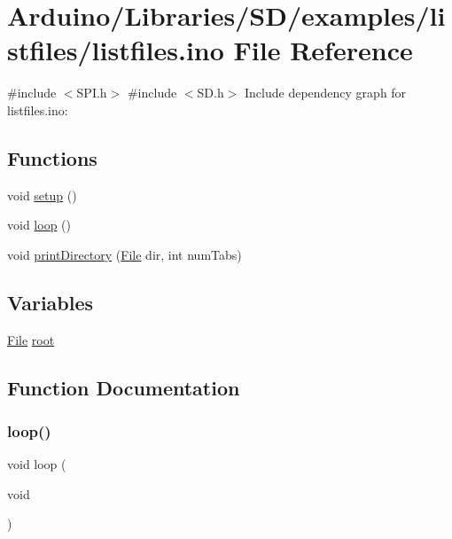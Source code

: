 \hypertarget{listfiles_8ino}{}\section{Arduino/\+Libraries/\+S\+D/examples/listfiles/listfiles.ino File Reference}
\label{listfiles_8ino}
{\ttfamily \#include $<$S\+P\+I.\+h$>$}\newline
{\ttfamily \#include $<$S\+D.\+h$>$}\newline
Include dependency graph for listfiles.\+ino\+:
\subsection*{Functions}
\begin{DoxyCompactItemize}
\item 
void \hyperlink{listfiles_8ino_a4fc01d736fe50cf5b977f755b675f11d}{setup} ()
\item 
void \hyperlink{listfiles_8ino_afe461d27b9c48d5921c00d521181f12f}{loop} ()
\item 
void \hyperlink{listfiles_8ino_a7af041cc472e7136af6f1ede239aabfb}{print\+Directory} (\hyperlink{class_s_d_lib_1_1_file}{File} dir, int num\+Tabs)
\end{DoxyCompactItemize}
\subsection*{Variables}
\begin{DoxyCompactItemize}
\item 
\hyperlink{class_s_d_lib_1_1_file}{File} \hyperlink{listfiles_8ino_a1859aa3abeb9f54662bf4e5963224ee7}{root}
\end{DoxyCompactItemize}


\subsection{Function Documentation}
\mbox{\label{listfiles_8ino_afe461d27b9c48d5921c00d521181f12f}} 
\subsubsection{\texorpdfstring{loop()}{loop()}}
{\footnotesize\ttfamily void loop (\begin{DoxyParamCaption}\item[{void}]{ }\end{DoxyParamCaption})}

